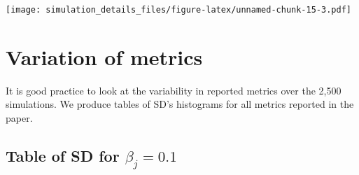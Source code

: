 \documentclass[
]{article}
\begin{document}
\texttt{[image: simulation\_details\_files/figure-latex/unnamed-chunk-15-3.pdf]}

\hypertarget{variation-of-metrics}{%
\section{Variation of metrics}\label{variation-of-metrics}}

It is good practice to look at the variability in reported metrics over
the 2,500 simulations. We produce tables of SD's histograms for all
metrics reported in the paper.

\hypertarget{table-of-sd-for-beta_j-0.1}{%
\subsection{\texorpdfstring{Table of SD for
\(\beta_j = 0.1\)}{Table of SD for \textbackslash beta\_j = 0.1}}\label{table-of-sd-for-beta_j-0.1}}
\end{document}
